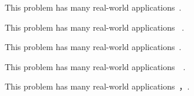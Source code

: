 This problem has many real-world applications~\cite{A}\cite{B}.

This problem has many real-world applications~\cite{A} \cite{B}.

This problem has many real-world applications~\cite{A, B}.

This problem has many real-world applications~\cite{A}~\cite{B}.

This problem has many real-world applications~\cite{A}，\cite{B}.
